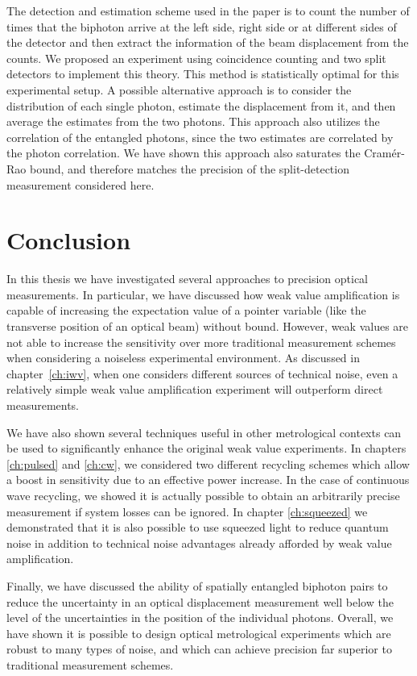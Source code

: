 The detection and estimation scheme used in the paper is to count the number of times that the biphoton arrive at the left side, right side or at different sides of the detector and then extract the information of the beam displacement from the counts. We proposed an experiment using coincidence counting and two split detectors to implement this theory. This method is statistically optimal for this experimental setup.  A possible alternative approach is to consider the distribution of each single photon, estimate the displacement from it, and then average the estimates from the two photons. This approach also utilizes the correlation of the entangled photons, since the two estimates are correlated by the photon correlation.  We have shown this approach also saturates the Cram\'{e}r-Rao bound, and therefore matches the precision of the split-detection measurement considered here.

\section{Conclusion}
In this thesis we have investigated several approaches to precision optical measurements.  In particular, we have discussed how weak value amplification is capable of increasing the expectation value of a pointer variable (like the transverse position of an optical beam) without bound.  However, weak values are not able to increase the sensitivity over more traditional measurement schemes when considering a noiseless experimental environment.  As discussed in chapter~\ref{ch:iwv}, when one considers different sources of technical noise, even a relatively simple weak value amplification experiment will outperform direct measurements.

We have also shown several techniques useful in other metrological contexts can be used to significantly enhance the original weak value experiments.  In chapters \ref{ch:pulsed} and \ref{ch:cw}, we considered two different recycling schemes which allow a boost in sensitivity due to an effective power increase.  In the case of continuous wave recycling, we showed it is actually possible to obtain an arbitrarily precise measurement if system losses can be ignored.  In chapter \ref{ch:squeezed} we demonstrated that it is also possible to use squeezed light to reduce quantum noise in addition to technical noise advantages already afforded by weak value amplification.

Finally, we have discussed the ability of spatially entangled biphoton pairs to reduce the uncertainty in an optical displacement measurement well below the level of the uncertainties in the position of the individual photons.  Overall, we have shown it is possible to design optical metrological experiments which are robust to many types of noise, and which can achieve precision far superior to traditional measurement schemes. 



